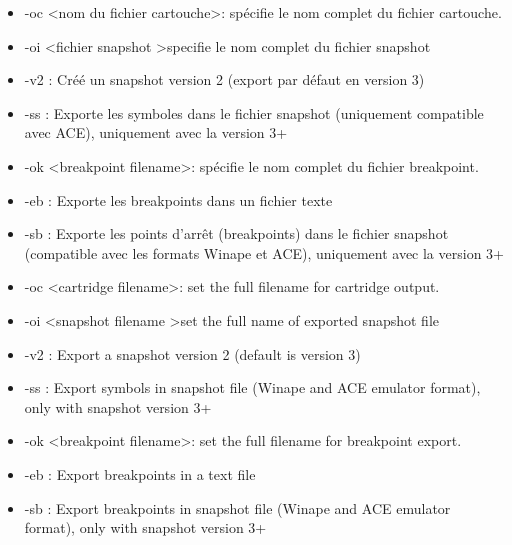 \begin{xfr}
\begin{itemize}
\item -oc \textless nom du fichier cartouche\textgreater : spécifie le nom complet du fichier cartouche.
\item -oi \textless fichier snapshot \textgreater specifie le nom complet du fichier snapshot
\item -v2 : Créé un snapshot version 2 (export par défaut en version 3)
\item -ss :	Exporte les symboles dans le fichier snapshot (uniquement compatible avec ACE), uniquement avec la version 3+
\item -ok \textless breakpoint filename\textgreater : spécifie le nom complet du fichier breakpoint.
\item -eb : Exporte les breakpoints dans un fichier texte
\item -sb : Exporte les points d'arrêt (breakpoints) dans le fichier snapshot (compatible avec les formats Winape et ACE), uniquement avec la version 3+
\end{itemize}
\end{xfr}

\begin{xen}
\begin{itemize}
\item -oc \textless cartridge filename\textgreater  : set the full filename for cartridge output.
\item -oi \textless snapshot filename \textgreater set the full name of exported snapshot file
\item -v2 : Export a snapshot version 2 (default is version 3)
\item -ss : Export symbols in snapshot file (Winape and ACE emulator format), only with snapshot version 3+
\item -ok \textless breakpoint filename\textgreater :	set the full filename for breakpoint export.
\item -eb : Export breakpoints in a text file
\item -sb : Export breakpoints in snapshot file (Winape and ACE emulator format), only with snapshot version 3+
\end{itemize}
\end{xen}


\subsection{}

